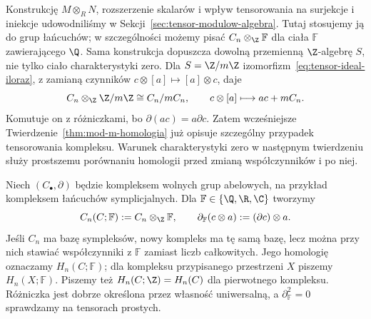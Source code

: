 \begin{uwaga}
\label{uwaga:tensor-modulow}
Konstrukcję $M\otimes_R N$, rozszerzenie skalarów
i wpływ tensorowania na surjekcje i iniekcje
udowodniliśmy w Sekcji~\ref{sec:tensor-modulow-algebra}.
Tutaj stosujemy ją do grup łańcuchów; w szczególności
możemy pisać $C_n\otimes_{\Z}\mathbb F$ dla ciała
$\mathbb F$ zawierającego $\Q$.
Sama konstrukcja dopuszcza dowolną przemienną $\Z$-algebrę $S$,
nie tylko ciało charakterystyki zero. Dla $S=\Z/m\Z$
izomorfizm~\eqref{eq:tensor-ideal-iloraz}, z zamianą czynników
$c\otimes[a]\mapsto[a]\otimes c$, daje
\[
 C_n\otimes_{\Z}\Z/m\Z\cong C_n/mC_n,
 \qquad c\otimes[a]\longmapsto ac+mC_n.
\]
Komutuje on z różniczkami, bo $\partial(ac)=a\partial c$.
Zatem wcześniejsze Twierdzenie~\ref{thm:mod-m-homologia}
już opisuje szczególny przypadek tensorowania kompleksu.
Warunek charakterystyki zero w następnym twierdzeniu służy
prostszemu porównaniu homologii przed zmianą współczynników i po niej.
\end{uwaga}

\begin{definicja}
\label{def:homologia-ciala-char-zero}
Niech $(C_\bullet,\partial)$ będzie kompleksem
wolnych grup abelowych, na przykład
kompleksem łańcuchów symplicjalnych.
Dla $\mathbb F\in\{\Q,\R,\C\}$ tworzymy
\[
 C_n(C;\mathbb F):=C_n\otimes_{\Z}\mathbb F,
 \qquad
 \partial_{\mathbb F}(c\otimes a)
       :=(\partial c)\otimes a.
\]
Jeśli $C_n$ ma bazę sympleksów, nowy kompleks
ma tę samą bazę, lecz można przy nich stawiać
współczynniki z $\mathbb F$ zamiast liczb całkowitych.
Jego homologię oznaczamy $H_n(C;\mathbb F)$;
dla kompleksu przypisanego przestrzeni $X$
piszemy $H_n(X;\mathbb F)$.
Piszemy też $H_n(C;\Z)=H_n(C)$ dla pierwotnego kompleksu.
Różniczka jest dobrze określona przez własność uniwersalną,
a $\partial_{\mathbb F}^2=0$ sprawdzamy na tensorach prostych.
\end{definicja}


